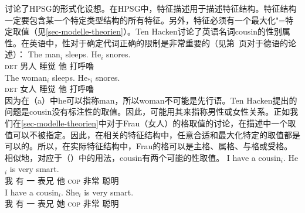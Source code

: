 \mbox{}讨论了HPSG\indexhpsgc 的形式化设想。在HPSG中，特征描述用于描述特征结构。特征结构一定要包含某一个特定类型结构的所有特征。另外，特征必须有一个最大化"=特定取值（见\ref{sec-modelle-theorien}）。Ten Hacken讨论了英语名词cousin的性别属性。在英语中，性对于确定代词正确的限制是非常重要的（见第~\pageref{le-buch}页对于德语的论述）：
\eal
\ex 
\gll The man$_i$ sleeps. He$_i$ snores.\\
	 \textsc{det} 男人 睡觉 他  打呼噜\\
\ex 
\gll The woman$_i$ sleeps. He$_{*i}$ snores.\\
	 \textsc{det} 女人 睡觉 他  打呼噜\\
\zl
因为在（a）中he可以指称man，所以woman不可能是先行语。Ten Hacken提出的问题是cousin没有标注性的取值。因此，可能用其来指称男性或女性关系。正如我们在\ref{sec-modelle-theorien}中对于Frau（女人）的格取值的讨论，在描述中一个取值可以不被指定。因此，在相关的特征结构中，任意合适和最大化特定的取值都是可以的。所以，在实际特征结构中，Frau的格可以是主格、属格、与格或受格。相似地，对应于（）中的用法，cousin有两个可能的性取值。
\eal
\ex 
\gll I have a cousin$_i$. He$_i$ is very smart.\\
	 我 有 一 表兄 他 \textsc{cop} 非常 聪明\\
\ex 
\gll I have a cousin$_i$. She$_i$ is very smart.\\
	 我 有 一 表兄 她 \textsc{cop} 非常 聪明\\
\zl

